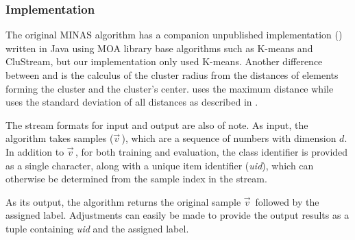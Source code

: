 \subsubsection{Implementation}\label{sec:implementation}

The original MINAS algorithm has a companion unpublished implementation ()
written in Java using MOA library base algorithms such as K-means and CluStream,
but our implementation only used K-means.
Another difference between  and \mfog is the calculus of the cluster radius 
from the distances of elements forming the cluster and the cluster's center.
 uses the maximum distance while \mfog uses the standard deviation
of all distances as described in \cite{Faria2015minas}.

\newcommand{\val}{$\vec{v}\,$\xspace}
The stream formats for input and output are also of note.
As input, the algorithm takes samples (\val), which are a sequence of numbers
with dimension $d$.
In addition to \val, for both training and evaluation, the class
identifier is provided as a single character, along with a unique item identifier
(\emph{uid}), which can otherwise be determined from the sample index in the stream.

As its output, the algorithm returns the original sample \val followed by the
assigned label. Adjustments can easily be made to provide the output results as
a tuple containing \emph{uid} and the assigned label.



